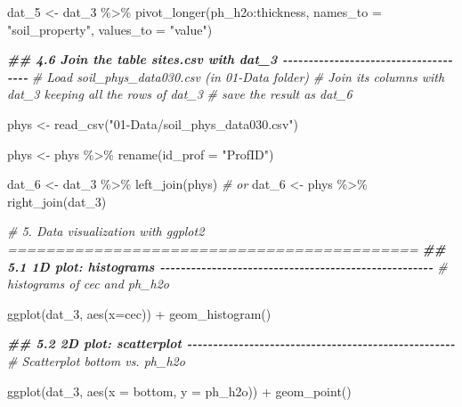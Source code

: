 \documentclass[
  10pt,
  b5paper,
  oneside]{book}
\newenvironment{Shaded}{\begin{snugshade}}{\end{snugshade}}
\newcommand{\AttributeTok}[1]{\textcolor[rgb]{0.77,0.63,0.00}{#1}}
\newcommand{\CommentTok}[1]{\textcolor[rgb]{0.56,0.35,0.01}{\textit{#1}}}
\newcommand{\DocumentationTok}[1]{\textcolor[rgb]{0.56,0.35,0.01}{\textbf{\textit{#1}}}}
\newcommand{\FunctionTok}[1]{\textcolor[rgb]{0.00,0.00,0.00}{#1}}
\newcommand{\NormalTok}[1]{#1}
\newcommand{\OtherTok}[1]{\textcolor[rgb]{0.56,0.35,0.01}{#1}}
\newcommand{\SpecialCharTok}[1]{\textcolor[rgb]{0.00,0.00,0.00}{#1}}
\newcommand{\StringTok}[1]{\textcolor[rgb]{0.31,0.60,0.02}{#1}}
\begin{document}
\begin{Shaded}
\begin{Highlighting}[]
\NormalTok{dat\_5 }\OtherTok{\textless{}{-}}\NormalTok{ dat\_3 }\SpecialCharTok{\%\textgreater{}\%} 
  \FunctionTok{pivot\_longer}\NormalTok{(ph\_h2o}\SpecialCharTok{:}\NormalTok{thickness, }\AttributeTok{names\_to =} \StringTok{"soil\_property"}\NormalTok{, }\AttributeTok{values\_to =} \StringTok{"value"}\NormalTok{)}

\DocumentationTok{\#\# 4.6 Join the table sites.csv with dat\_3 {-}{-}{-}{-}{-}{-}{-}{-}{-}{-}{-}{-}{-}{-}{-}{-}{-}{-}{-}{-}{-}{-}{-}{-}{-}{-}{-}{-}{-}{-}{-}{-}{-}{-}{-}{-}{-}}
\CommentTok{\# Load soil\_phys\_data030.csv (in 01{-}Data folder) }
\CommentTok{\# Join its columns with dat\_3 keeping all the rows of dat\_3}
\CommentTok{\# save the result as dat\_6}

\NormalTok{phys }\OtherTok{\textless{}{-}} \FunctionTok{read\_csv}\NormalTok{(}\StringTok{"01{-}Data/soil\_phys\_data030.csv"}\NormalTok{)}

\NormalTok{phys }\OtherTok{\textless{}{-}}\NormalTok{ phys }\SpecialCharTok{\%\textgreater{}\%} \FunctionTok{rename}\NormalTok{(}\AttributeTok{id\_prof =} \StringTok{"ProfID"}\NormalTok{)}

\NormalTok{dat\_6 }\OtherTok{\textless{}{-}}\NormalTok{ dat\_3 }\SpecialCharTok{\%\textgreater{}\%} 
  \FunctionTok{left\_join}\NormalTok{(phys)}
\CommentTok{\# or}
\NormalTok{dat\_6 }\OtherTok{\textless{}{-}}\NormalTok{ phys }\SpecialCharTok{\%\textgreater{}\%} 
  \FunctionTok{right\_join}\NormalTok{(dat\_3)}

\CommentTok{\# 5. Data visualization with ggplot2 ===========================================}
\DocumentationTok{\#\# 5.1 1D plot: histograms {-}{-}{-}{-}{-}{-}{-}{-}{-}{-}{-}{-}{-}{-}{-}{-}{-}{-}{-}{-}{-}{-}{-}{-}{-}{-}{-}{-}{-}{-}{-}{-}{-}{-}{-}{-}{-}{-}{-}{-}{-}{-}{-}{-}{-}{-}{-}{-}{-}{-}{-}{-}{-}}
\CommentTok{\# histograms of cec and ph\_h2o}

\FunctionTok{ggplot}\NormalTok{(dat\_3, }\FunctionTok{aes}\NormalTok{(}\AttributeTok{x=}\NormalTok{cec)) }\SpecialCharTok{+} \FunctionTok{geom\_histogram}\NormalTok{()}

\DocumentationTok{\#\# 5.2 2D plot: scatterplot {-}{-}{-}{-}{-}{-}{-}{-}{-}{-}{-}{-}{-}{-}{-}{-}{-}{-}{-}{-}{-}{-}{-}{-}{-}{-}{-}{-}{-}{-}{-}{-}{-}{-}{-}{-}{-}{-}{-}{-}{-}{-}{-}{-}{-}{-}{-}{-}{-}{-}{-}{-}}
\CommentTok{\# Scatterplot bottom vs. ph\_h2o}

\FunctionTok{ggplot}\NormalTok{(dat\_3, }\FunctionTok{aes}\NormalTok{(}\AttributeTok{x =}\NormalTok{ bottom, }\AttributeTok{y =}\NormalTok{ ph\_h2o)) }\SpecialCharTok{+} 
  \FunctionTok{geom\_point}\NormalTok{() }


\end{Highlighting}
\end{Shaded}
\end{document}
